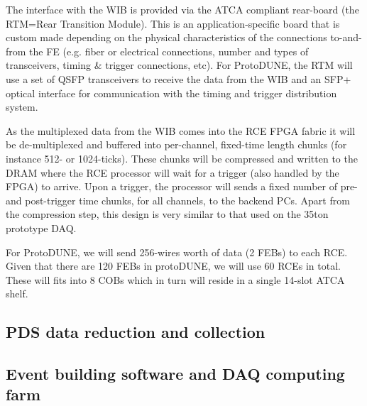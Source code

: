 The interface with the WIB is provided via the ATCA compliant rear-board
(the RTM=Rear Transition Module).  This is an application-specific board
that is custom made depending on the physical characteristics of the
connections to-and-from the FE (e.g. fiber or electrical connections,
number and types of transceivers, timing \& trigger connections, etc).
For ProtoDUNE, the RTM will use a set of QSFP transceivers to receive
the data from the WIB and an SFP+ optical interface for communication
with the timing and trigger distribution system.

As the multiplexed data from the WIB comes into the RCE FPGA fabric
it will be de-multiplexed and buffered into per-channel, fixed-time
length chunks (for instance 512- or 1024-ticks).  These chunks will be
compressed and written to the DRAM where the RCE processor will wait
for a trigger (also handled by the FPGA) to arrive.  Upon a trigger, the
processor will sends a fixed number of pre- and post-trigger time chunks,
for all channels, to the backend PCs.  Apart from the compression step,
this design is very similar to that used on the 35ton prototype DAQ.

For ProtoDUNE, we will send 256-wires worth of data (2 FEBs) to each RCE.
Given that there are 120 FEBs in protoDUNE, we will use 60 RCEs in total.
These will fits into 8 COBs which in turn will reside in a single 14-slot
ATCA shelf.



\subsection{PDS data reduction and collection}


\subsection{Event building software and DAQ computing farm }




